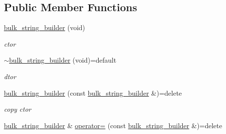 \subsection*{Public Member Functions}
\begin{DoxyCompactItemize}
\item 
\mbox{\label{classcpp__redis_1_1builders_1_1bulk__string__builder_a1c0bee3cd6fbafc782cfe93c0b650451}} 
\mbox{\hyperlink{classcpp__redis_1_1builders_1_1bulk__string__builder_a1c0bee3cd6fbafc782cfe93c0b650451}{bulk\+\_\+string\+\_\+builder}} (void)
\begin{DoxyCompactList}\small\item\em ctor \end{DoxyCompactList}\item 
\mbox{\label{classcpp__redis_1_1builders_1_1bulk__string__builder_a88c7142bab456f70da9f9a6252e2affb}} 
\mbox{\hyperlink{classcpp__redis_1_1builders_1_1bulk__string__builder_a88c7142bab456f70da9f9a6252e2affb}{$\sim$bulk\+\_\+string\+\_\+builder}} (void)=default
\begin{DoxyCompactList}\small\item\em dtor \end{DoxyCompactList}\item 
\mbox{\label{classcpp__redis_1_1builders_1_1bulk__string__builder_ac3bd10f8972fa1856b6e7b7262ecd98f}} 
\mbox{\hyperlink{classcpp__redis_1_1builders_1_1bulk__string__builder_ac3bd10f8972fa1856b6e7b7262ecd98f}{bulk\+\_\+string\+\_\+builder}} (const \mbox{\hyperlink{classcpp__redis_1_1builders_1_1bulk__string__builder}{bulk\+\_\+string\+\_\+builder}} \&)=delete
\begin{DoxyCompactList}\small\item\em copy ctor \end{DoxyCompactList}\item 
\mbox{\label{classcpp__redis_1_1builders_1_1bulk__string__builder_a972355e0910faa9e3daf4f5c67c3e581}} 
\mbox{\hyperlink{classcpp__redis_1_1builders_1_1bulk__string__builder}{bulk\+\_\+string\+\_\+builder}} \& \mbox{\hyperlink{classcpp__redis_1_1builders_1_1bulk__string__builder_a972355e0910faa9e3daf4f5c67c3e581}{operator=}} (const \mbox{\hyperlink{classcpp__redis_1_1builders_1_1bulk__string__builder}{bulk\+\_\+string\+\_\+builder}} \&)=delete

\end{DoxyCompactItemize}
